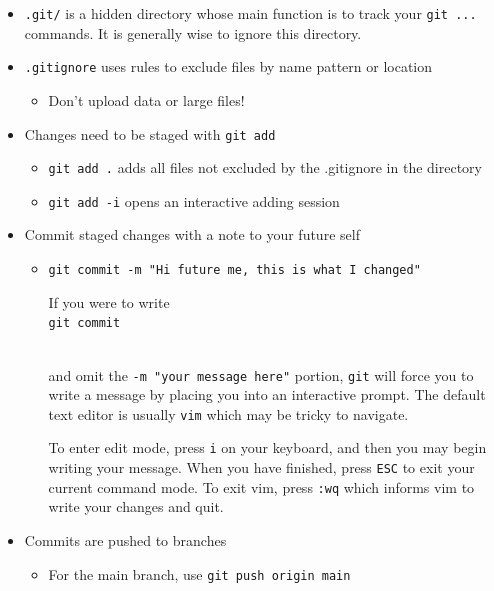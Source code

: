 \documentclass[
  letterpaper,
  DIV=11,
  numbers=noendperiod]{scrreprt}
\providecommand{\tightlist}{%
  \setlength{\itemsep}{0pt}\setlength{\parskip}{0pt}}\usepackage{longtable,booktabs,array}
\begin{document}
\begin{itemize}
\item
  \texttt{.git/} is a hidden directory whose main function is to track
  your \texttt{git\ ...} commands. It is generally wise to ignore this
  directory.
\item
  \texttt{.gitignore} uses rules to exclude files by name pattern or
  location

  \begin{itemize}
  \tightlist
  \item
    Don't upload data or large files!
  \end{itemize}
\item
  Changes need to be staged with \texttt{git\ add}

  \begin{itemize}
  \item
    \texttt{git\ add\ .} adds all files not excluded by the .gitignore
    in the directory
  \item
    \texttt{git\ add\ -i} opens an interactive adding session
  \end{itemize}
\item
  Commit staged changes with a note to your future self

  \begin{itemize}
  \item
    \texttt{git\ commit\ -m\ "Hi\ future\ me,\ this\ is\ what\ I\ changed"}

    \begin{tcolorbox}[enhanced jigsaw, bottomtitle=1mm, bottomrule=.15mm, toprule=.15mm, opacityback=0, leftrule=.75mm, breakable, colback=white, toptitle=1mm, left=2mm, coltitle=black, titlerule=0mm, opacitybacktitle=0.6, title=\textcolor{quarto-callout-note-color}{\faInfo}\hspace{0.5em}{note: Using \texttt{vim}}, rightrule=.15mm, arc=.35mm, colframe=quarto-callout-note-color-frame, colbacktitle=quarto-callout-note-color!10!white]

    If you were to write\\
    \texttt{git\ commit}\strut \\
    and omit the \texttt{-m\ "your\ message\ here"} portion,
    \texttt{git} will force you to write a message by placing you into
    an interactive prompt. The default text editor is usually
    \texttt{vim} which may be tricky to navigate.

    To enter edit mode, press \texttt{i} on your keyboard, and then you
    may begin writing your message. When you have finished, press
    \texttt{ESC} to exit your current command mode. To exit vim, press
    \texttt{:wq} which informs vim to write your changes and quit.

    \end{tcolorbox}
  \end{itemize}
\item
  Commits are pushed to branches

  \begin{itemize}
  \tightlist
  \item
    For the main branch, use \texttt{git\ push\ origin\ main}
  \end{itemize}
\end{itemize}
\end{document}
